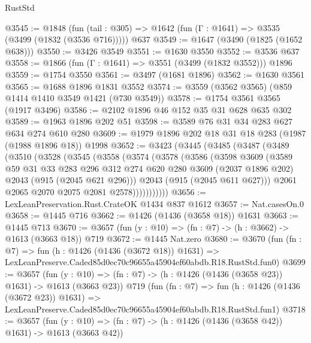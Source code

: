 \begin{lexlean}{RustStd}
\begin{coremodule}
@3545 := @1848
    (fun (tail : @305) => @1642 (fun (Γ : @1641) => @3535 (@3499 (@1832 (@3536 @716)))))
    @637
@3549 := @1647 (@3490 (@1825 (@1652 @638)))
@3550 := @3426 @3549
@3551 := @1630 @3550
@3552 := @3536 @637
@3558 := @1866 (fun (Γ : @1641) => @3551 (@3499 (@1832 @3552))) @1896
@3559 := @1754 @3550
@3561 := @3497 (@1681 @1896)
@3562 := @1630 @3561
@3565 := @1688 @1896 @1831 @3552
@3574 := @3559 (@3562 @3565) (@859 @1414 @1410 @3549 @1421 (@730 @3549))
@3578 := @1754 @3561 @3565 (@1917 @3496)
@3586 := @2102 @1896 @46 @152 @35 @31 @628 @635 @302
@3589 := @1963 @1896 @202 @51
@3598 := @3589 @76 @31 @34 @283 @627 @634 @274 @610 @280
@3609 := @1979 @1896 @202 @18 @31 @18 @283 (@1987 (@1988 @1896 @18)) @1998
@3652 := @3423
    (@3445
      (@3485
        (@3487
          (@3489
            (@3510
              (@3528
                (@3545
                  (@3558
                    (@3574
                      (@3578
                        (@3586
                          (@3598
                            @3609
                            (@3589
                              @59
                              @31
                              @33
                              @283
                              @296
                              @312
                              @274
                              @620
                              @280
                              @3609
                              (@2037 @1896 @202)
                              @2043
                              (@915 (@2045 @621 @296)))
                            @2043
                            (@915 (@2045 @611 @627)))
                          @2061
                          @2065
                          @2070
                          @2075
                          @2081
                          @2578)))))))))))
@3656 := LexLeanPreservation.Rust.CrateOK @1434 @837 @1612
@3657 := Nat.casesOn.{0}
@3658 := @1445 @716
@3662 := @1426 (@1436 (@3658 @18)) @1631
@3663 := @1445 @713
@3670 := @3657 (fun (y : @10) => (fn : @7) -> (h : @3662) -> @1613 (@3663 @18)) @719
@3672 := @1445 Nat.zero
@3680 := @3670
    (fun (fn : @7) =>
    fun (h : @1426 (@1436 (@3672 @18)) @1631) =>
    LexLeanPreserve.Caded85d0ec70c96655a45904ef60abdb.R18.RustStd.fun0)
@3699 := @3657
    (fun (y : @10) => (fn : @7) -> (h : @1426 (@1436 (@3658 @23)) @1631) -> @1613 (@3663 @23))
    @719
    (fun (fn : @7) =>
    fun (h : @1426 (@1436 (@3672 @23)) @1631) =>
    LexLeanPreserve.Caded85d0ec70c96655a45904ef60abdb.R18.RustStd.fun1)
@3718 := @3657
    (fun (y : @10) => (fn : @7) -> (h : @1426 (@1436 (@3658 @42)) @1631) -> @1613 (@3663 @42))

\end{coremodule}
\end{lexlean}
